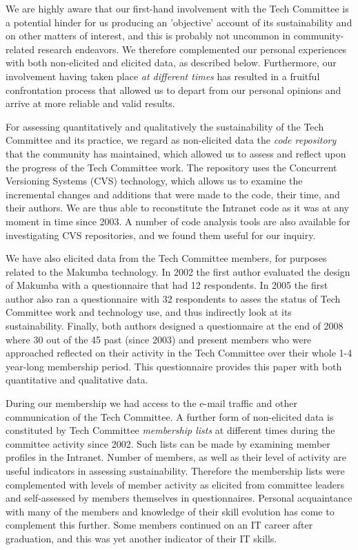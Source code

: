 \documentclass{sig-alt-release2}
\begin{document}
We are highly aware that our first-hand involvement with the Tech Committee is a potential hinder for us producing an 'objective' account of its sustainability and on other matters of interest, and this is probably not uncommon in community-related research endeavors. We therefore complemented our personal experiences with both non-elicited and elicited data, as described below. Furthermore, our involvement having taken place {\it at different times} has resulted in a fruitful confrontation process that allowed us to depart from our personal opinions and arrive at more reliable and valid results.

For assessing quantitatively and qualitatively the sustainability of the Tech Committee and its practice, we regard as non-elicited data the {\it code repository} that the community has maintained, which allowed us to assess and reflect upon the progress of the Tech Committee work. The repository uses the Concurrent Versioning Systems (CVS) technology, which allows us to examine the incremental changes and additions that were made to the code, their time, and their authors. We are thus able to reconstitute the Intranet code as it was at any moment in time since 2003. A number of code analysis tools are also available for investigating CVS repositories, and we found them useful for our inquiry.

We have also elicited data from the Tech Committee members, for purposes related to the Makumba technology. In 2002 the first author evaluated the design of Makumba with a questionnaire that had 12 respondents. In 2005 the first author also ran a questionnaire with 32 respondents to asses the status of Tech Committee work and technology use, and thus indirectly look at its sustainability. Finally, both authors designed a questionnaire at the end of 2008 where 30 out of the 45 past (since 2003) and present members who were approached reflected on their activity in the Tech Committee over their whole 1-4 year-long membership period. This questionnaire provides this paper with both quantitative and qualitative data. 

During our membership we had access to the e-mail traffic and other communication of the Tech Committee. A further form of non-elicited data is constituted by Tech Committee {\it membership lists} at different times during the committee activity since 2002. Such lists can be made by examining member profiles in the Intranet. Number of members, as well as their level of activity are useful indicators in assessing sustainability. Therefore the membership lists were complemented with levels of member activity as elicited from committee leaders and self-assessed by members themselves in questionnaires. Personal acquaintance with many of the members and knowledge of their skill evolution has come to complement this further. Some members continued on an IT career after graduation, and this was yet another indicator of their IT skills. 
\end{document}
